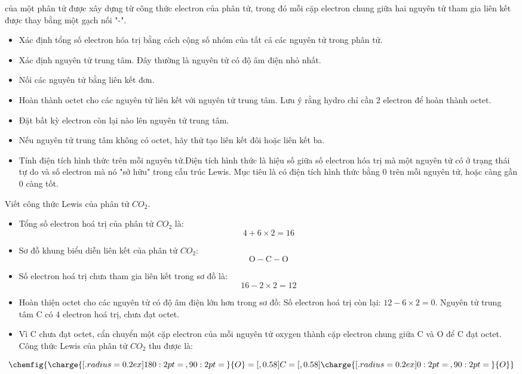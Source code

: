 	\begin{hopdongian}
		 của một phân tử được xây dựng từ công thức electron của phân tử, trong đó mỗi cặp electron chung giữa hai nguyên tử tham gia liên kết được thay bằng một gạch nối "-".
	\end{hopdongian}
	\begin{phuongphap}
		\begin{itemize}
			\item  {} Xác định tổng số electron hóa trị bằng cách cộng số nhóm của tất cả các nguyên tử trong phân tử.
			\item  {} Xác định nguyên tử trung tâm. Đây thường là nguyên tử có độ âm điện nhỏ nhất.
			\item  {} Nối các nguyên tử bằng liên kết đơn.
			\item  {} Hoàn thành octet cho các nguyên tử liên kết với nguyên tử trung tâm. Lưu ý rằng hydro chỉ cần 2 electron để hoàn thành octet.
			\item  {} Đặt bất kỳ electron còn lại nào lên nguyên tử trung tâm.
			\item  {} Nếu nguyên tử trung tâm không có octet, hãy thử tạo liên kết đôi hoặc liên kết ba.
			\item  {} Tính điện tích hình thức trên mỗi nguyên tử.Điện tích hình thức là hiệu số giữa số electron hóa trị mà một nguyên tử có ở trạng thái tự do và số electron mà nó "sở hữu" trong cấu trúc Lewis. Mục tiêu là có điện tích hình thức bằng 0 trên mỗi nguyên tử, hoặc càng gần 0 càng tốt.
		\end{itemize}
	\end{phuongphap}
	\begin{vd}
		Viết công thức Lewis của phân tử $CO_2$.
		\begin{itemize}
			\item {} Tổng số electron hoá trị của phân tử $CO_2$ là:
			\[4+6\times 2=16\]
			\item  {} Sơ đồ khung biểu diễn liên kết của phân tử $CO_2$:
			\[\mathrm{O}-\mathrm{C}-\mathrm{O}\]
			\item {} Số electron hoá trị chưa tham gia liên kết trong sơ đồ là:
			\[16-2\times 2=12\]
			\item {}Hoàn thiện octet cho các nguyên tử có độ âm điện lớn hơn trong sơ đồ:
			Số electron hoá trị còn lại: $12-6\times 2=0$.
			Nguyên tử trung tâm C có 4 electron hoá trị, chưa đạt octet.
			\item {} Vì C chưa đạt octet, cẩn chuyển một cặp electron của mỗi nguyên tử oxygen thành cặp electron chung giữa C và O để C đạt octet. Công thức Lewis của phân tử $CO_2$ thu được là:
		\end{itemize}
		\[\chemfig{\charge{[.radius=0.2ex]180:2pt=\:,90:2pt=\:}{O}=[,0.58]C=[,0.58]\charge{[.radius=0.2ex]0:2pt=\:,90:2pt=\:}{O}}\]
		\end{vd}
